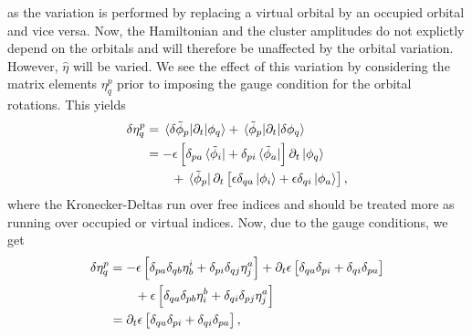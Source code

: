             as the variation is performed by replacing a virtual orbital by an
            occupied orbital and vice versa.
            Now, the Hamiltonian and the cluster amplitudes do not explictly
            depend on the orbitals and will therefore be unaffected by the
            orbital variation.
            However, $\hat{\eta}$ will be varied.
            We see the effect of this variation by considering the matrix
            elements $\eta^{p}_{q}$ prior to imposing the gauge condition for
            the orbital rotations.
            This yields
            \begin{align}
                \delta\eta^{p}_{q}
                &= \mel*{\delta\tilde{\phi}_p}{
                    \partial_t
                }{\phi_q}
                + \mel*{\tilde{\phi}_p}{
                    \partial_t
                }{\delta\phi_q}
                \\
                &=
                -\epsilon\left[ 
                    \delta_{pa}\bra*{\tilde{\phi}_i}
                    + \delta_{pi}\bra*{\tilde{\phi}_a}
                 \right]\partial_t\ket*{\phi_q}
                \nonumber \\
                &\qquad
                + \bra*{\tilde{\phi}_p}\partial_t\left[ 
                    \epsilon \delta_{qa}\ket*{\phi_i}
                    + \epsilon \delta_{qi}\ket*{\phi_a}
                 \right],
            \end{align}
            where the Kronecker-Deltas run over free indices and should be
            treated more as running over occupied or virtual indices.
            Now, due to the gauge conditions, we get
            \begin{align}
                \delta\eta^{p}_{q}
                &=
                - \epsilon\left[ 
                    \delta_{pa}\delta_{qb}\eta^{i}_{b}
                    + \delta_{pi}\delta_{qj}\eta^{a}_{j}
                 \right]
                + \partial_t \epsilon \left[ 
                    \delta_{qa}\delta_{pi}
                    + \delta_{qi}\delta_{pa}
                 \right]
                \nonumber \\
                &\qquad
                + \epsilon\left[ 
                    \delta_{qa}\delta_{pb}\eta^{b}_{i}
                    + \delta_{qi}\delta_{pj}\eta^{a}_{j}
                 \right]
                \\
                &=
                \partial_t \epsilon \left[ 
                    \delta_{qa}\delta_{pi}
                    + \delta_{qi}\delta_{pa}
                 \right],
            \end{align}
